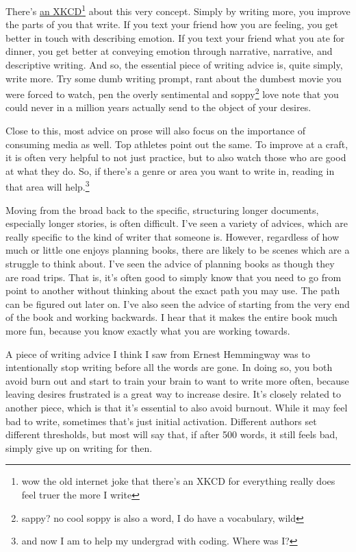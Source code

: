 \documentclass[12pt]{article}
\renewcommand{\,}{\textsuperscript{,}}
\begin{document}
There's \href{https://xkcd.com/1414/}{an XKCD}\footnote{wow the old internet joke that there's an XKCD for everything really does feel truer the more I write} about this very concept.  
Simply by writing more, you improve the parts of you that write.  
If you text your friend how you are feeling, you get better in touch with describing emotion.  
If you text your friend what you ate for dinner, you get better at conveying emotion through narrative, narrative, and descriptive writing.  
And so, the essential piece of writing advice is, quite simply, write more.  
Try some dumb writing prompt, rant about the dumbest movie you were forced to watch, pen the overly sentimental and soppy\footnote{sappy? no cool soppy is also a word, I do have a vocabulary, wild} love note that you could never in a million years actually send to the object of your desires.

Close to this, most advice on prose will also focus on the importance of consuming media as well.  
Top athletes point out the same.  
To improve at a craft, it is often very helpful to not just practice, but to also watch those who are good at what they do.  
So, if there's a genre or area you want to write in, reading in that area will help.\footnote{and now I am to help my undergrad with coding. Where was I?}

Moving from the broad back to the specific, structuring longer documents, especially longer stories, is often difficult.  
I've seen a variety of advices, which are really specific to the kind of writer that someone is.  
However, regardless of how much or little one enjoys planning books, there are likely to be scenes which are a struggle to think about.  
I've seen the advice of planning books as though they are road trips.  
That is, it's often good to simply know that you need to go from point to another without thinking about the exact path you may use.  
The path can be figured out later on.  
I've also seen the advice of starting from the very end of the book and working backwards.  
I hear that it makes the entire book much more fun, because you know exactly what you are working towards.

A piece of writing advice I think I saw from Ernest Hemmingway was to intentionally stop writing before all the words are gone.  
In doing so, you both avoid burn out and start to train your brain to want to write more often, because leaving desires frustrated is a great way to increase desire.  
It's closely related to another piece, which is that it's essential to also avoid burnout.  
While it may feel bad to write, sometimes that's just initial activation.  
Different authors set different thresholds, but most will say that, if after 500 words, it still feels bad, simply give up on writing for then.
\end{document}
